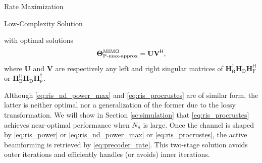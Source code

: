 \documentclass[journal]{IEEEtran}
\begin{document}
\begin{section}{Rate Maximization}
\begin{subsection}{Low-Complexity Solution}
\begin{itemize}
\begin{mini!}
			\end{mini!}
			with optimal solutions \cite[(6.4.1)]{Golub2013}
			\begin{equation}
				\label{eq:ris_procrustes}
				\mathbf{\Theta}_\textnormal{P-max-approx}^\textnormal{MIMO} = \mathbf{U} \mathbf{V}^\mathsf{H},
			\end{equation}
			where $\mathbf{U}$ and $\mathbf{V}$ are respectively any left and right singular matrices of $\mathbf{H}_\mathrm{B}^\dagger \mathbf{H}_\mathrm{D} \mathbf{H}_\mathrm{F}^\mathsf{H}$ or $\mathbf{H}_\mathrm{B}^\mathsf{H} \mathbf{H}_\mathrm{D} \mathbf{H}_\mathrm{F}^\dagger$.
		\end{itemize}

		Although \eqref{eq:ris_nd_power_max} and \eqref{eq:ris_procrustes} are of similar form, the latter is neither optimal nor a generalization of the former due to the lossy transformation.
		We will show in Section \ref{sc:simulation} that \eqref{eq:ris_procrustes} achieves near-optimal performance when $N_\mathrm{S}$ is large.
		Once the channel is shaped by \eqref{eq:ris_power} or \eqref{eq:ris_nd_power_max} or \eqref{eq:ris_procrustes}, the active beamforming is retrieved by \eqref{eq:precoder_rate}.
		This two-stage solution avoids outer iterations and efficiently handles (or avoids) inner iterations.
	\end{subsection}



\end{section}
\end{document}
